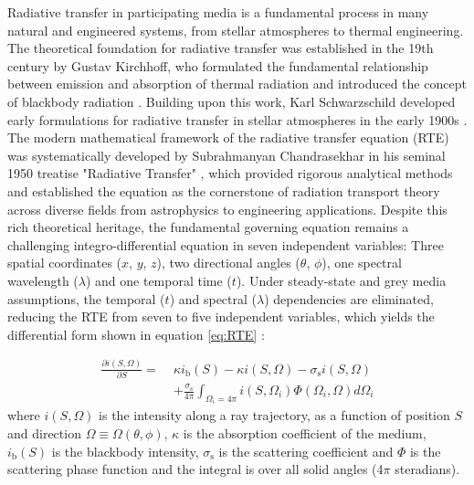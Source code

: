 \documentclass[preprint,1p,times]{elsarticle}
\theoremstyle{plain}
\theoremstyle{definition}
\theoremstyle{remark}
\begin{document}
Radiative transfer in participating media is a fundamental process in many natural and engineered systems, from stellar atmospheres to thermal engineering. The theoretical foundation for radiative transfer was established in the 19th century by Gustav Kirchhoff, who formulated the fundamental relationship between emission and absorption of thermal radiation and introduced the concept of blackbody radiation \citep{Kirchhoff1860}. Building upon this work, Karl Schwarzschild developed early formulations for radiative transfer in stellar atmospheres in the early 1900s \citep{Schwarzschild1906}. The modern mathematical framework of the radiative transfer equation (RTE) was systematically developed by Subrahmanyan Chandrasekhar in his seminal 1950 treatise "Radiative Transfer" \citep{Chandrasekhar1950}, which provided rigorous analytical methods and established the equation as the cornerstone of radiation transport theory across diverse fields from astrophysics to engineering applications. Despite this rich theoretical heritage, the fundamental governing equation remains a challenging integro-differential equation in seven independent variables: Three spatial coordinates ($x$, $y$, $z$), two directional angles ($\theta$, $\phi$), one spectral wavelength ($\lambda$) and one temporal time ($t$). Under steady-state and grey media assumptions, the temporal ($t$) and spectral ($\lambda$) dependencies are eliminated, reducing the RTE from seven to five independent variables, which yields the differential form shown in equation \eqref{eq:RTE} \citep{Daun2021}:

\begin{equation}
\begin{split}
\frac{\partial i(S,\Omega)}{\partial S} = \; &
\kappa i_\mathrm{b}(S) 
- \kappa i(S,\Omega)
- \sigma_\mathrm{s} i(S,\Omega) \\
& + \frac{\sigma_\mathrm{s}}{4 \pi} \int_{\Omega_i=4 \pi}
i(S,\Omega_i) \Phi(\Omega_i,\Omega) d\Omega_i
\end{split}
\label{eq:RTE}
\end{equation}
where $i(S,\Omega)$ is the intensity along a ray trajectory, as a function of position $S$ and direction $\Omega\equiv\Omega(\theta,\phi)$, $\kappa$ is the absorption coefficient of the medium, $i_\mathrm{b}(S)$ is the blackbody intensity, $\sigma_\mathrm{s}$ is the scattering coefficient and $\Phi$ is the scattering phase function and the integral is over all solid angles (4$\pi$ steradians).
\end{document}
